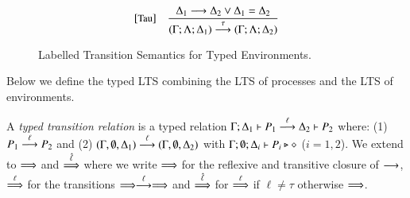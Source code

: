 \begin{figure}[t]
\[\begin{array}{lc}
{		}
		\\[8mm]
		\eltsrule{Tau}&\tree{
			\Delta_1 \red \Delta_2 \vee \Delta_1 = \Delta_2
		}{
			(\Gamma; \Lambda; \Delta_1) \by{\tau} (\Gamma; \Lambda; \Delta_2)
		}
	\end{array}
	\]
\caption{Labelled Transition Semantics for Typed Environments. 
\label{fig:envLTS}}
\Hline
\end{figure}

Below we define the typed LTS combining 
the LTS of processes and the LTS of environments. 

\smallskip

\begin{definition}\label{d:tlts}\rm
A {\em typed transition relation} is a typed relation
$\Gamma; \Delta_1 \vdash P_1 \stackrel{\ell}{\longrightarrow} \Delta_2 \vdash P_2$
	where:
%
(1) $P_1 \stackrel{\ell}{\longrightarrow} P_2$ and (2) 
$(\Gamma, \emptyset, \Delta_1) \stackrel{\ell}{\longrightarrow} (\Gamma, \emptyset, \Delta_2)$ 
with $\Gamma; \emptyset; \Delta_i \vdash P_i \triangleright \diamond$ 
($i=1,2$). 
%
%
We extend to $\stackrel{}{\Longrightarrow}$ 
and $\stackrel{\hat{\ell}}{\Longrightarrow}$ 
where we write 
$\stackrel{}{\Longrightarrow}$ for the reflexive and
transitive closure of $\stackrel{}{\longrightarrow}$, $\stackrel{\ell}{\Longrightarrow}$ for the transitions
$\stackrel{}{\Longrightarrow}\stackrel{\ell}{\longrightarrow}\stackrel{}{\Longrightarrow}$ and $\stackrel{\hat{\ell}}{\Longrightarrow}$ for $\stackrel{\ell}{\Longrightarrow}$ if
$\ell\not = \tau$ otherwise $\stackrel{}{\Longrightarrow}$. 
\end{definition}

